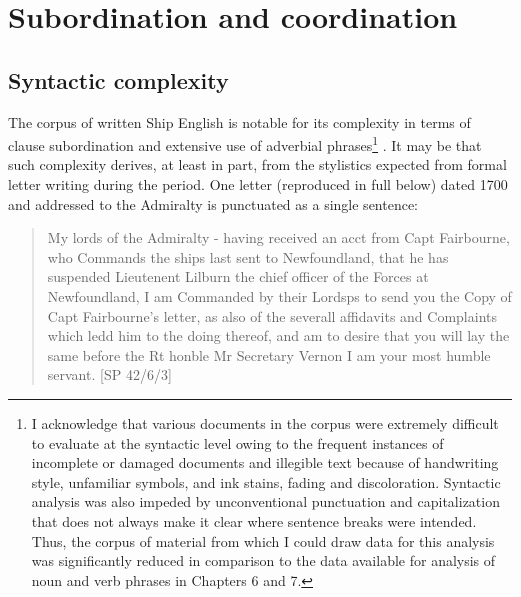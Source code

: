 \section{{Subordination} {and} {coordination}}%

\subsection{{Syntactic} {complexity}}%

  The corpus of written Ship English is notable for its complexity in terms of clause subordination and extensive use of adverbial phrases\footnote{I acknowledge that various documents in the corpus were extremely difficult to evaluate at the syntactic level owing to the frequent instances of incomplete or damaged documents and illegible text because of handwriting style, unfamiliar symbols, and ink stains, fading and discoloration. Syntactic analysis was also impeded by unconventional punctuation and capitalization that does not always make it clear where sentence breaks were intended. Thus, the corpus of material from which I could draw data for this analysis was significantly reduced in comparison to the data available for analysis of noun and verb phrases in Chapters 6 and 7.} . It may be that such complexity derives, at least in part, from the stylistics expected from formal letter writing during the period. One letter (reproduced in full below) dated 1700 and addressed to the Admiralty is punctuated as a single sentence: 

\begin{quotation}
My lords of the Admiralty - having received an acct from Capt Fairbourne, who Commands the ships last sent to Newfoundland, that he has suspended Lieutenent Lilburn the chief officer of the Forces at Newfoundland, I am Commanded by their Lordsps to send you the Copy of Capt Fairbourne’s letter, as also of the severall affidavits and Complaints which ledd him to the doing thereof, and am to desire that you will lay the same before the Rt honble Mr Secretary Vernon I am your most humble servant. [SP 42/6/3] \end{quotation}

